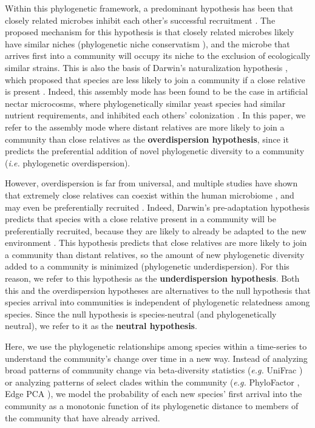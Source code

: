 \documentclass{article}
\begin{document}
\par
Within this phylogenetic framework, a predominant hypothesis has been that closely related microbes inhibit each other’s successful recruitment \cite{Nemergut2013,Fukami2015,Verster2018}. The proposed mechanism for this hypothesis is that closely related microbes likely have similar niches (phylogenetic niche conservatism \cite{Losos2008}), and the microbe that arrives first into a community will occupy its niche to the exclusion of ecologically similar strains. This is also the basis of Darwin’s naturalization hypothesis \cite{Darwin1859}, which proposed that species are less likely to join a community if a close relative is present \cite{Ma2016}. Indeed, this assembly mode has been found to be the case in artificial nectar microcosms, where phylogenetically similar yeast species had similar nutrient requirements, and inhibited each others’ colonization \cite{Peay2012}. In this paper, we refer to the assembly mode where distant relatives are more likely to join a community than close relatives as the \textbf{overdispersion hypothesis}, since it predicts the preferential addition of novel phylogenetic diversity to a community (\emph{i.e.} phylogenetic overdispersion).
\par
However, overdispersion is far from universal, and multiple studies have shown that extremely close relatives can coexist within the human microbiome \cite{Li2016}, and may even be preferentially recruited \cite{Brown2018}. Indeed, Darwin’s pre-adaptation hypothesis predicts that species with a close relative present in a community will be preferentially recruited, because they are likely to already be adapted to the new environment \cite{Darwin1859}. This hypothesis predicts that close relatives are more likely to join a community than distant relatives, so the amount of new phylogenetic diversity added to a community is minimized (phylogenetic underdispersion). For this reason, we refer to this hypothesis as the \textbf{underdispersion hypothesis}. Both this and the overdispersion hypotheses are alternatives to the null hypothesis that species arrival into communities is independent of phylogenetic relatedness among species. Since the null hypothesis is species-neutral (and phylogenetically neutral), we refer to it as the \textbf{neutral hypothesis}.
\par
Here, we use the phylogenetic relationships among species within a time-series to understand the community’s change over time in a new way. Instead of analyzing broad patterns of community change via beta-diversity statistics (\emph{e.g.} UniFrac \cite{Lozupone2005}) or analyzing patterns of select clades within the community (\emph{e.g.} PhyloFactor \cite{Washburne2017}, Edge PCA \cite{Matsen2013}), we model the probability of each new species’ first arrival into the community as a monotonic function of its phylogenetic distance to members of the community that have already arrived.
\end{document}
